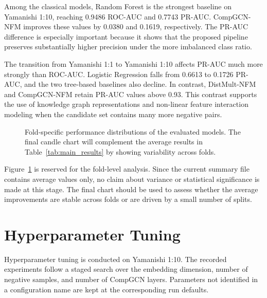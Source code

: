 Among the classical models, Random Forest is the strongest baseline on
Yamanishi 1:10, reaching 0.9486 ROC-AUC and 0.7743 PR-AUC. CompGCN-NFM improves
these values by 0.0380 and 0.1619, respectively. The PR-AUC difference is
especially important because it shows that the proposed pipeline preserves
substantially higher precision under the more imbalanced class ratio.

The transition from Yamanishi 1:1 to Yamanishi 1:10 affects PR-AUC much more
strongly than ROC-AUC. Logistic Regression falls from 0.6613 to 0.1726 PR-AUC,
and the two tree-based baselines also decline. In contrast, DistMult-NFM and
CompGCN-NFM retain PR-AUC values above 0.93. This contrast supports the use of
knowledge graph representations and non-linear feature interaction modeling
when the candidate set contains many more negative pairs.

\begin{figure}[H]
    \centering
    \caption{Fold-specific performance distributions of the evaluated models.
    The final candle chart will complement the average results in
    Table~\ref{tab:main_results} by showing variability across folds.}
    \label{fig:fold_specific_candle_results}
\end{figure}

Figure~\ref{fig:fold_specific_candle_results} is reserved for the fold-level
analysis. Since the current summary file contains average values only, no claim
about variance or statistical significance is made at this stage. The final
chart should be used to assess whether the average improvements are stable
across folds or are driven by a small number of splits.

\section{Hyperparameter Tuning}
\label{sec:hyperparameter_tuning}

Hyperparameter tuning is conducted on Yamanishi 1:10. The recorded experiments
follow a staged search over the embedding dimension, number of negative samples,
and number of CompGCN layers. Parameters not identified in a configuration name
are kept at the corresponding run defaults.

